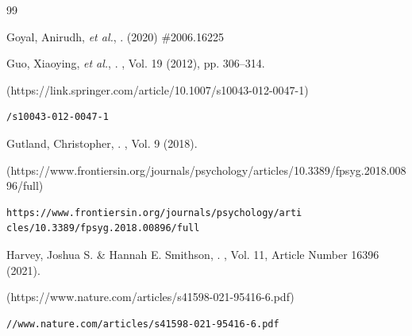 \begin{thebibliography}{99}
{\begin{bItem}[AnirudhGoyal]
Goyal, Anirudh, \textit{et al.},%
{}.
(2020) \#2006.16225
%
\end{bItem}






\begin{bItem}[XiaoyingGuo]
Guo, Xiaoying, \textit{et al.},
.
,
Vol. 19 (2012), pp. 306--314. 
%
\begin{boxurl}(https://link.springer.com/article/10.1007/s10043-012-0047-1)
\begin{lstlisting}
/s10043-012-0047-1
\end{lstlisting}
\end{boxurl}\end{bItem}








\begin{bItem}[ChristopherGutland]
Gutland, Christopher,
.
,
Vol. 9 (2018). 
%
\begin{boxurl}(https://www.frontiersin.org/journals/psychology/articles/10.3389/fpsyg.2018.00896/full)
\begin{lstlisting}
https://www.frontiersin.org/journals/psychology/arti
cles/10.3389/fpsyg.2018.00896/full
\end{lstlisting}
\end{boxurl}\end{bItem}







\begin{bItem}[HarveySmithson]
Harvey, Joshua S. \& Hannah E. Smithson, 
.  
, Vol. 11, 
Article Number 16396 (2021). 
%
\begin{boxurl}(https://www.nature.com/articles/s41598-021-95416-6.pdf)
\begin{lstlisting}
//www.nature.com/articles/s41598-021-95416-6.pdf
\end{lstlisting}
\end{boxurl}\end{bItem}

}
\end{thebibliography}
